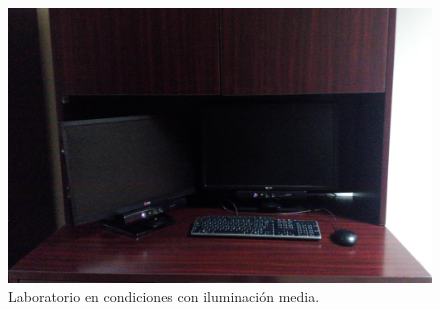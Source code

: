\begin{figure}[h!]
\begin{center} 
\includegraphics[scale=0.09]{./Figures/mediailuminacion.jpg}
\end{center}
\caption{Laboratorio en condiciones con iluminación media.}
\label{fig:LabMedioIluminado} 
\end{figure}  


